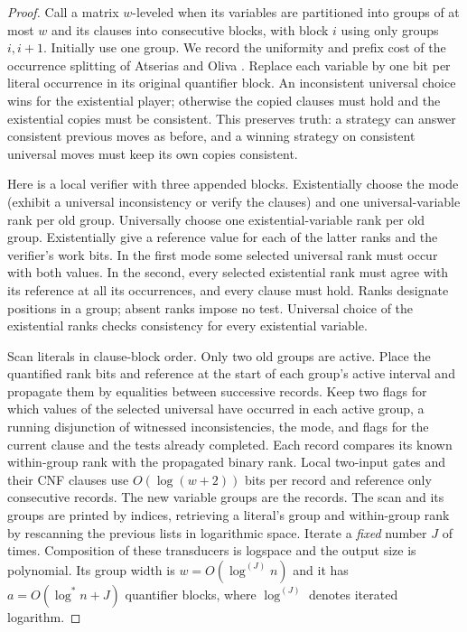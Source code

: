 \begin{proof}
Call a matrix $w$-leveled when its variables are partitioned into
groups of at most $w$ and its clauses into consecutive blocks, with
block $i$ using only groups $i,i+1$. Initially use one group. We
record the uniformity and prefix cost of the occurrence splitting of
Atserias and Oliva \cite[Lemma~2]{AtseriasOliva2014}. Replace each
variable by one bit per literal occurrence in its original quantifier
block. An inconsistent universal choice wins for the existential
player; otherwise the copied clauses must hold and the existential
copies must be consistent. This preserves truth: a strategy can
answer consistent previous moves as before, and a winning strategy
on consistent universal moves must keep its own copies consistent.

Here is a local verifier with three appended blocks. Existentially
choose the mode (exhibit a universal inconsistency or verify the
clauses) and one universal-variable rank per old group. Universally
choose one existential-variable rank per old group. Existentially
give a reference value for each of the latter ranks and the verifier's
work bits. In the first mode some selected universal rank must occur
with both values. In the second, every selected existential rank must
agree with its reference at all its occurrences, and every clause
must hold. Ranks designate positions in a group; absent ranks impose
no test. Universal choice of the existential ranks checks consistency
for every existential variable.

Scan literals in clause-block order. Only two old groups are active.
Place the quantified rank bits and reference at the start of each
group's active interval and propagate them by equalities between
successive records. Keep two flags for which values of the selected
universal have occurred in each active group, a running disjunction
of witnessed inconsistencies, the mode, and flags for the current
clause and the tests already completed. Each record compares its
known within-group rank with the propagated binary rank. Local
two-input gates and their CNF clauses use $O(\log(w+2))$ bits per
record and reference only consecutive records. The new variable
groups are the records. The scan and its groups are printed by
indices, retrieving a literal's group and within-group rank by
rescanning the previous lists in logarithmic space. Iterate a
\emph{fixed} number $J$ of times. Composition of these transducers
is logspace and the output size is polynomial. Its group width
is $w=O(\log^{(J)} n)$ and it has $a=O(\log^* n+J)$ quantifier
blocks, where $\log^{(J)}$ denotes iterated logarithm.


\end{proof}

